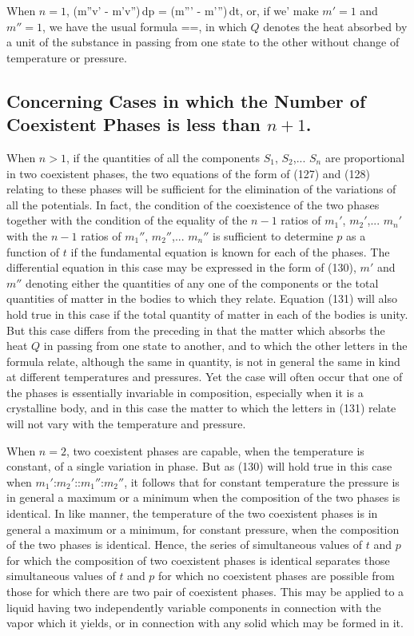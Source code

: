 \documentclass[12pt]{memoir}
\begin{document}
When $n= 1$,
\eqs (m''v' - m'v'')\,dp = (m''\eta' - m'\eta'')\,dt, \label{130}\eqe
or, if we' make $m'= 1$ and $m''= 1$, we have the usual formula
\eqs
{}==, \label{131}\eqe
in which $Q$ denotes the heat absorbed by a unit of the substance in passing from one state to the other without change of temperature or pressure.

\subsection{Concerning Cases in which the Number of Coexistent Phases is less than $n+ 1$.}
When $n > 1$, if the quantities of all the components $S_1$, $S_2$,... $S_n$ are proportional in two coexistent phases, the two equations of the form of (127) and (128) relating to these phases will be sufficient for the elimination of the variations of all the potentials. In fact, the condition of the coexistence of the two phases together with the condition of the equality of the $n-1$ ratios of $m_1'$, $m_2'$,... $m_n'$ with the $n-1$ ratios of $m_1''$, $m_2''$,... $m_n''$ is sufficient to determine $p$ as a function of $t$ if the fundamental equation is known for each of the phases. The differential equation in this case may be expressed in the form of (130), $m'$ and $m''$ denoting either the quantities of any one of the components or the total quantities of matter in the bodies to which they relate. Equation (131) will also hold true in this case if the total quantity of matter in each of the bodies is unity. But this case differs from the preceding in that the matter which absorbs the heat $Q$ in passing from one state to another, and to which the other letters in the formula relate, although the same in quantity, is not in general the same in kind at different temperatures and pressures. Yet the case will often occur that one of the phases is essentially invariable in composition, especially when it is a crystalline body, and in this case the matter to which the letters in (131) relate will not vary with the temperature and pressure.


When $n=2$, two coexistent phases are capable, when the temperature is constant, of a single variation in phase. But as (130) will hold true in this case when $m_1'$:$m_2'$::$m_1''$:$m_2''$, it follows that for constant temperature the pressure is in general a maximum or a minimum when the composition of the two phases is identical. In like manner, the temperature of the two coexistent phases is in general a maximum or a minimum, for constant pressure, when the composition of the two phases is identical. Hence, the series of simultaneous values of $t$ and $p$ for which the composition of two coexistent phases is identical separates those simultaneous values of $t$ and $p$ for which no coexistent phases are possible from those for which there are two pair of coexistent phases. This may be applied to a liquid having two independently variable components in connection with the vapor which it yields, or in connection with any solid which may be formed in it.
\end{document}
